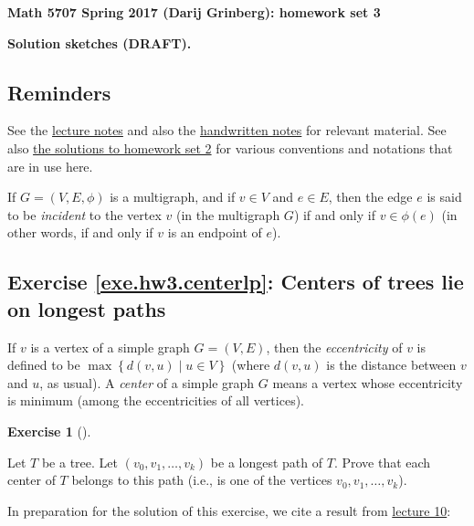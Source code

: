 \documentclass[numbers=enddot,12pt,final,onecolumn,notitlepage]{scrartcl}%
\newcounter{exer}
\theoremstyle{definition}
\newtheorem{exmp}[exer]{Exercise}
\newenvironment{exercise}[1][]
{\begin{exmp}[#1]\begin{leftbar}}
{\end{leftbar}\end{exmp}}
\newcommand{\set}[1]{\left\{ #1 \right\}}
\newcommand{\tup}[1]{\left( #1 \right)}
\begin{document}
\begin{center}
\textbf{Math 5707 Spring 2017 (Darij Grinberg): homework set 3}

\textbf{Solution sketches (DRAFT).}
\end{center}

\tableofcontents

\subsection{Reminders}

See the
\href{http://www-users.math.umn.edu/~dgrinber/5707s17/nogra.pdf}{lecture notes}
and also the
\href{http://www-users.math.umn.edu/~dgrinber/5707s17/}{handwritten notes}
for relevant material.
See also
\href{http://www-users.math.umn.edu/~dgrinber/5707s17/hw2s.pdf}{the solutions to homework set 2}
for various conventions and notations that are in use here.

If $G = \tup{V, E, \phi}$ is a multigraph, and if $v \in V$ and
$e \in E$, then the edge $e$ is said to be \textit{incident} to
the vertex $v$ (in the multigraph $G$) if and only if
$v \in \phi\tup{e}$ (in other words, if and only if $v$ is an
endpoint of $e$).

\subsection{Exercise \ref{exe.hw3.centerlp}: Centers of trees lie on
longest paths}

If $v$ is a vertex of a simple graph $G = \tup{V, E}$, then the
\textit{eccentricity} of $v$ is defined to be
$\max \set{ d\tup{v, u} \mid u \in V }$ (where $d\tup{v, u}$ is the
distance between $v$ and $u$, as usual). A \textit{center} of a simple
graph $G$ means a vertex whose eccentricity is minimum (among the
eccentricities of all vertices).

\begin{exercise} \label{exe.hw3.centerlp}
Let $T$ be a tree. Let $\tup{v_0, v_1, \ldots, v_k}$ be a longest path
of $T$. Prove that each center of $T$ belongs to this path (i.e., is
one of the vertices $v_0, v_1, \ldots, v_k$).
\end{exercise}

In preparation for the solution of this exercise, we cite a result
from
\href{http://www-users.math.umn.edu/~dgrinber/5707s17/5707lec10.pdf}{lecture 10}:
\end{document}
